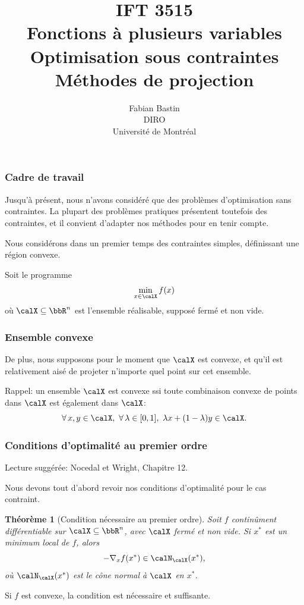 \documentclass[t,aspectratio=169,usepdftitle=false]{beamer}
\title[IFT3515]{IFT 3515\\Fonctions à plusieurs variables\\Optimisation sous contraintes\\Méthodes de projection}
\author[Fabian Bastin]{Fabian Bastin\\DIRO\\Université de Montréal}
\date{}
\newtheorem{thm}{Théorème}
\def\cX{\calX}
\begin{document}
\frame{\titlepage}

\begin{frame}
\frametitle{Cadre de travail}

Jusqu'à présent, nous n'avons considéré que des problèmes d'optimisation sans contraintes.
La plupart des problèmes pratiques présentent toutefois des contraintes, et il convient d'adapter nos méthodes pour en tenir compte.

\mbox{}

Nous considérons dans un premier temps des contraintes simples, définissant une région convexe.

\mbox{}

Soit le programme
$$
\min_{x \in \cX} f(x)
$$
où $\cX \subseteq \bbR^n$ est l'ensemble réalisable, supposé fermé et non vide.

\end{frame}

\begin{frame}
\frametitle{Ensemble convexe}

De plus, nous supposons pour le moment que $\cX$ est convexe, et qu'il est relativement aisé de projeter n'importe quel point sur cet ensemble.

\mbox{}

Rappel: un ensemble $\cX$ est convexe ssi toute combinaison convexe de points dans $\cX$ est également dans $\cX$:
$$
\forall\, x, y \in \cX,\ \forall\, \lambda \in [0,1],\ \lambda x + (1-\lambda)y \in \cX.
$$
\end{frame}
	
\begin{frame}
\frametitle{Conditions d'optimalité au premier ordre}

Lecture suggérée: Nocedal et Wright, Chapitre 12.

\mbox{}

Nous devons tout d'abord revoir nos conditions d'optimalité pour le cas contraint.

\mbox{}

\begin{thm}[Condition nécessaire au premier ordre]
Soit $f$ continûment différentiable sur $\cX \subseteq \bbR^n$, avec $\cX$ fermé et non vide.
Si $x^*$ est un minimum local de $f$, alors
\[
-\nabla_x f(x^*) \in \calN_{\cX}(x^*),
\]
où $\calN_{\cX}(x^*)$ est le cône normal à $\cX$ en $x^*$.
\end{thm}	

\mbox{}

Si $f$ est convexe, la condition est nécessaire et suffisante.

\end{frame}
\end{document}
